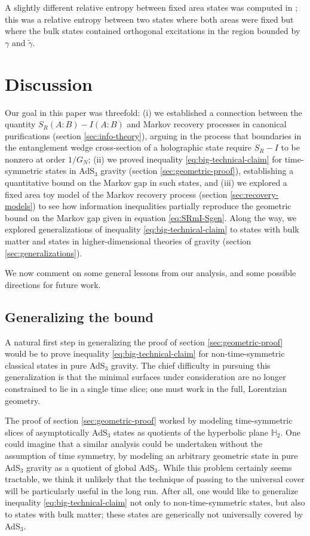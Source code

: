 \documentclass[a4paper,11pt]{article}
\renewcommand{\tilde}{\widetilde}
\begin{document}
A slightly different relative entropy between fixed area states was computed in \cite{kudler2021relative}; this was a relative entropy between two states where both areas were fixed but where the bulk states contained orthogonal excitations in the region bounded by $\gamma$ and $\tilde{\gamma}.$

\section{Discussion}
\label{sec:discussion}

Our goal in this paper was threefold: (i) we established a connection between the quantity $S_R(A:B) - I(A:B)$ and Markov recovery processes in canonical purifications (section \ref{sec:info-theory}), arguing in the process that boundaries in the entanglement wedge cross-section of a holographic state require $S_R - I$ to be nonzero at order $1/G_N$; (ii) we proved inequality \eqref{eq:big-technical-claim} for time-symmetric states in AdS$_3$ gravity (section \ref{sec:geometric-proof}), establishing a quantitative bound on the Markov gap in such states, and (iii) we explored a fixed area toy model of the Markov recovery process (section \ref{sec:recovery-models}) to see how information inequalities partially reproduce the geometric bound on the Markov gap given in equation \eqref{eq:SRmI-Sgen}. Along the way, we explored generalizations of inequality \eqref{eq:big-technical-claim} to states with bulk matter and states in higher-dimensional theories of gravity (section \ref{sec:generalizations}).

We now comment on some general lessons from our analysis, and some possible directions for future work.

\subsection{Generalizing the bound}
\label{subsec:future-generalizations}

A natural first step in generalizing the proof of section \ref{sec:geometric-proof} would be to prove inequality \eqref{eq:big-technical-claim} for non-time-symmetric classical states in pure AdS$_3$ gravity. The chief difficulty in pursuing this generalization is that the minimal surfaces under consideration are no longer constrained to lie in a single time slice; one must work in the full, Lorentzian geometry.

The proof of section \ref{sec:geometric-proof} worked by modeling time-symmetric slices of asymptotically AdS$_3$ states as quotients of the hyperbolic plane $\mathbb{H}_{2}$. One could imagine that a similar analysis could be undertaken without the assumption of time symmetry, by modeling an arbitrary geometric state in pure AdS$_3$ gravity as a quotient of global AdS$_3$. While this problem certainly seems tractable, we think it unlikely that the technique of passing to the universal cover will be particularly useful in the long run. After all, one would like to generalize inequality \eqref{eq:big-technical-claim} not only to non-time-symmetric states, but also to states with bulk matter; these states are generically not universally covered by AdS$_3$.
\end{document}
